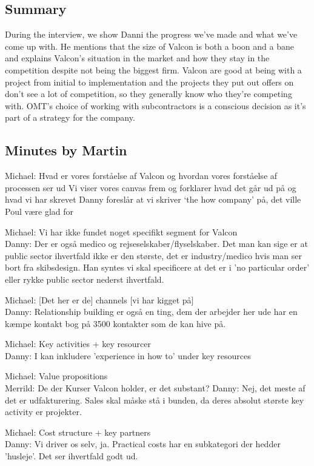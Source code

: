 \label{app:danni_inline}
\begin{linenumbers*}
\subsection{Summary}
During the interview, we show Danni the progress we've made and what we've come up with. 
He mentions that the size of Valcon is both a boon and a bane and explains Valcon's situation in the market and how they stay in the competition despite not being the biggest firm. 
Valcon are good at being with a project from initial to implementation and the projects they put out offers on don't see a lot of competition, so they generally know who they're competing with. 
OMT's choice of working with subcontractors is a conscious decision as it's part of a strategy for the company.

\subsection{Minutes by Martin}
Michael: Hvad er vores forståelse af Valcon og hvordan vores forståelse af processen ser ud
Vi viser vores canvas frem og forklarer hvad det går ud på og hvad vi har skrevet
Danny foreslår at vi skriver ‘the how company’ på, det ville Poul være glad for

Michael: Vi har ikke fundet noget specifikt segment for Valcon\\
Danny: Der er også medico og rejseselskaber/flyselskaber. Det man kan sige er at public sector ihvertfald ikke er den største, det er industry/medico hvis man ser bort fra skibsdesign. Han syntes vi skal specificere at det er i 'no particular order' eller rykke public sector nederst ihvertfald.

Michael: [Det her er de] channels [vi har kigget på]\\
Danny: Relationship building er også en ting, dem der arbejder her ude har en kæmpe kontakt bog på 3500 kontakter som de kan hive på.

Michael: Key activities + key resourcer\\
Danny: I kan inkludere 'experience in how to' under key resources

Michael: Value propositions\\
Merrild: De der Kurser Valcon holder, er det substant?
Danny: Nej, det meste af det er udfakturering. Sales skal måske stå i bunden, da deres absolut største key activity er projekter.

Michael: Cost structure + key partners\\
Danny: Vi driver os selv, ja. Practical costs har en subkategori der hedder 'husleje'. Det ser ihvertfald godt ud.


\end{linenumbers*}
